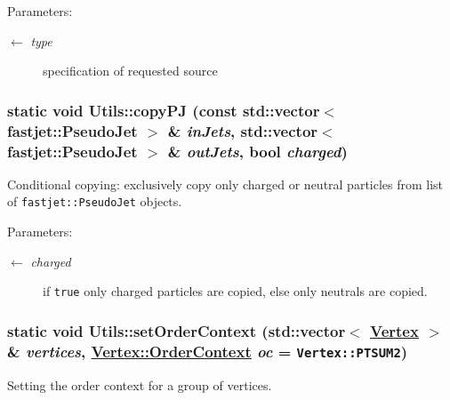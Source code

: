\begin{Desc}
\item[Parameters:]
\begin{description}
\item[\mbox{$\leftarrow$} {\em type}]specification of requested source \end{description}
\end{Desc}
\hypertarget{structUtils_e158c164f104a0d12bffcdb3b8c42674}{
\subsubsection[copyPJ]{\setlength{\rightskip}{0pt plus 5cm}static void Utils::copy\-PJ (const std::vector$<$ fastjet::Pseudo\-Jet $>$ \& {\em in\-Jets}, std::vector$<$ fastjet::Pseudo\-Jet $>$ \& {\em out\-Jets}, bool {\em charged})}}
\label{structUtils_e158c164f104a0d12bffcdb3b8c42674}


Conditional copying: exclusively copy only charged or neutral particles from list of {\tt fastjet::Pseudo\-Jet} objects. 

\begin{Desc}
\item[Parameters:]
\begin{description}
\item[\mbox{$\leftarrow$} {\em charged}]if {\tt true} only charged particles are copied, else only neutrals are copied. \end{description}
\end{Desc}
\hypertarget{structUtils_69035af71f5fb92ea00e07fa70c8c517}{
\subsubsection[setOrderContext]{\setlength{\rightskip}{0pt plus 5cm}static void Utils::set\-Order\-Context (std::vector$<$ \hyperlink{classVertex}{Vertex} $>$ \& {\em vertices}, \hyperlink{classVertex_40a06cc3fde98913c8259e3c11cd37ec}{Vertex::Order\-Context} {\em oc} = {\tt Vertex::PTSUM2})}}
\label{structUtils_69035af71f5fb92ea00e07fa70c8c517}


Setting the order context for a group of vertices. 

